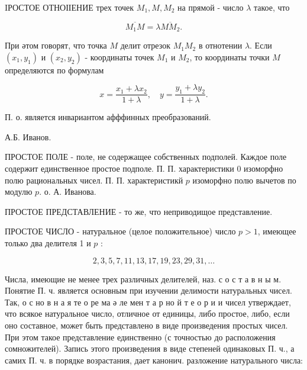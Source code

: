 \documentclass[10pt]{article}
\begin{document}
IРОСТОЕ ОТНОІІЕНИЕ трех точек $M_{1}, M, M_{2}$ на прямой - число $\lambda$ такое, что



\[

\overline{M_{1} M}=\lambda \overline{M M_{2}} .

\]



При әтом говорят, что точка $M$ делит отрезок $M_{1} M_{2}$ в отнотении $\lambda$. Если $\left(x_{1}, y_{1}\right)$ и $\left(x_{2}, y_{2}\right)$ - координаты точек $M_{1}$ и $M_{2}$, то координаты точки $M$ определяются по формулам



\[

x=\frac{x_{1}+\lambda x_{2}}{1+\lambda}, \quad y=\frac{y_{1}+\lambda y_{2}}{1+\lambda} .

\]



П. о. является инвариантом афффинных преобразований.



А.Б. Иванов.



ПРОСТОЕ ПОЛЕ - поле, не содержащее собственных подполей. Каждое поле содержит единственное простое подполе. П. П. характеристики 0 изоморфно полю рациональных чисел. П. П. характеристикй $p$ изоморфно полю вычетов по модулю $p$. о. А. Иванова.



ПРОСТОЕ ПРЕДСТАВЛЕНИЕ - то же, что неприводищое представление.



ПРОСТОЕ ЧИСЛО - натуральное (целое положительное) число $p>1$, имеющее только два делителя 1 и $p$ :



\[

2,3,5,7,11,13,17,19,23,29,31, \ldots

\]



Числа, имеющие не менее трех различных делителей, наз. с о с т а в н ы м. Понятие П. ч. является основным при изучении делимости натуральных чисел. Так, о с но в н а я те о ре ма ә ле мен т а р но й т е о р и и чисел утверждает, что всякое натуральное число, отличное от единицы, либо простое, либо, если оно составное, может быть представлено в виде произведения простых чисел. При этом такое представление единственно (с точностью до расположения сомножителей). Запись этого произведения в виде степеней одинаковых П. ч., а самих П. ч. в порядке возрастания, дает канонич. разложение натурального числа:
\end{document}
